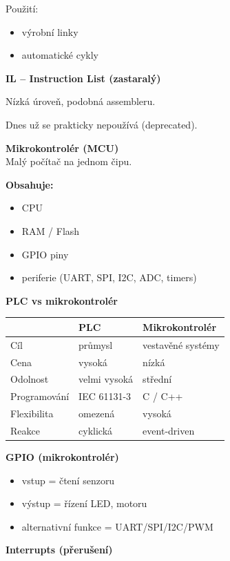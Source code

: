 \documentclass[a4paper,10pt]{article}
\begin{document}
\begin{vysvetlenibox}
Použití:
\begin{itemize}
\item výrobní linky
\item automatické cykly
\end{itemize}

\textbf{IL – Instruction List (zastaralý)}

Nízká úroveň, podobná assembleru.

Dnes už se prakticky nepoužívá (deprecated).


\textbf{Mikrokontrolér (MCU)}\\
Malý počítač na jednom čipu.

\textbf{Obsahuje:}
\begin{itemize}
\item CPU
\item RAM / Flash
\item GPIO piny
\item periferie (UART, SPI, I2C, ADC, timers)
\end{itemize}

\textbf{PLC vs mikrokontrolér}

\begin{tabularx}{\linewidth}{l X X}
\toprule
 & PLC & Mikrokontrolér \\
\midrule
Cíl & průmysl & vestavěné systémy \\
Cena & vysoká & nízká \\
Odolnost & velmi vysoká & střední \\
Programování & IEC 61131-3 & C / C++ \\
Flexibilita & omezená & vysoká \\
Reakce & cyklická & event-driven \\
\bottomrule
\end{tabularx}

\textbf{GPIO (mikrokontrolér)}

\begin{itemize}
\item vstup = čtení senzoru
\item výstup = řízení LED, motoru
\item alternativní funkce = UART/SPI/I2C/PWM
\end{itemize}

\textbf{Interrupts (přerušení)}


\end{vysvetlenibox}
\end{document}
